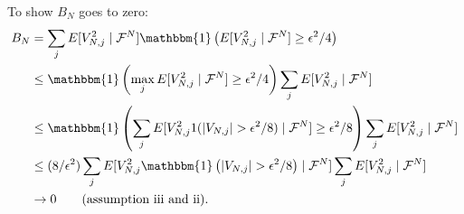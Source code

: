 \documentclass{article}
\begin{document}
% 
% 


% 
% 
% 

To show $B_N$ goes to zero:
\begin{align*}
B_N &= \sum_j E[ V_{N,j}^2 \mid \mathcal{F}^N] \mathbbm{1}\left(  E[V_{N,j}^2 \mid \mathcal{F}^N] \ge \epsilon^2/4 \right) \\
&\le \mathbbm{1} \left( \max_j E[V_{N,j}^2 \mid \mathcal{F}^N] \ge \epsilon^2/4 \right) \sum_j E[ V_{N,j}^2 \mid \mathcal{F}^N] \\
&\le \mathbbm{1} \left( \sum_j E[ V_{N,j}^2 1(|V_{N,j}| > \epsilon^2/8) \mid \mathcal{F}^N] \ge \epsilon^2/8 \right) \sum_j E[ V_{N,j}^2 \mid \mathcal{F}^N] \\
&\le (8/\epsilon^2)\sum_j E[ V_{N,j}^2 \mathbbm{1} \left(|V_{N,j}| > \epsilon^2/8 \right) \mid \mathcal{F}^N] \sum_j E[ V_{N,j}^2 \mid \mathcal{F}^N] \\
&\to 0 \tag{assumption iii and ii}.
\end{align*}
\end{document}
